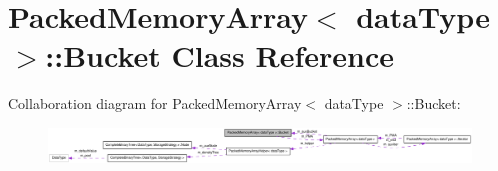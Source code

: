 \hypertarget{class_packed_memory_array_1_1_bucket}{
\section{PackedMemoryArray$<$ dataType $>$::Bucket Class Reference}
\label{class_packed_memory_array_1_1_bucket}
}


Collaboration diagram for PackedMemoryArray$<$ dataType $>$::Bucket:\nopagebreak
\begin{figure}[H]
\begin{center}
\leavevmode
\includegraphics[width=400pt]{class_packed_memory_array_1_1_bucket__coll__graph}
\end{center}
\end{figure}
